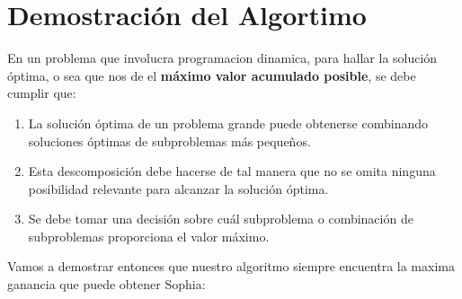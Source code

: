 \section{Demostración del Algortimo}

En un problema que involucra programacion dinamica, para hallar la solución óptima, o sea que nos de el \textbf{máximo valor acumulado posible}, se debe cumplir que:

\begin{enumerate}
    \item La solución óptima de un problema grande puede obtenerse combinando soluciones óptimas de subproblemas más pequeños.
    \item Esta descomposición debe hacerse de tal manera que no se omita ninguna posibilidad relevante para alcanzar la solución óptima.
    \item Se debe tomar una decisión sobre cuál subproblema o combinación de subproblemas proporciona el valor máximo.
\end{enumerate}

Vamos a demostrar entonces que nuestro algoritmo siempre encuentra la maxima ganancia que puede obtener Sophia:

